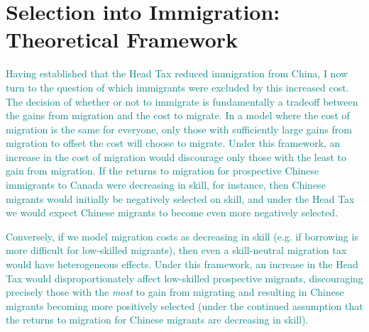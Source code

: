 \section{Selection into Immigration: Theoretical Framework}
\textcolor{teal}{
Having established that the Head Tax reduced immigration from China, I now turn to the question of which immigrants were excluded by this increased cost. The decision of whether or not to immigrate is fundamentally a tradeoff between the gains from migration and the cost to migrate. In a model where the cost of migration is the same for everyone, only those with sufficiently large gains from migration to offset the cost will choose to migrate. Under this framework, an increase in the cost of migration would discourage only those with the least to gain from migration. If the returns to migration for prospective Chinese immigrants to Canada were decreasing in skill, for instance, then Chinese migrants would initially be negatively selected on skill, and under the Head Tax we would expect Chinese migrants to become even more negatively selected.}

\textcolor{teal}{Conversely, if we model migration costs as decreasing in skill (e.g. if borrowing is more difficult for low-skilled migrants), then even a skill-neutral migration tax would have heterogeneous effects. Under this framework, an increase in the Head Tax would disproportionately affect low-skilled prospective migrants, discouraging precisely those with the \textit{most} to gain from migrating and resulting in Chinese migrants becoming more positively selected (under the continued assumption that the returns to migration for Chinese migrants are decreasing in skill).}




